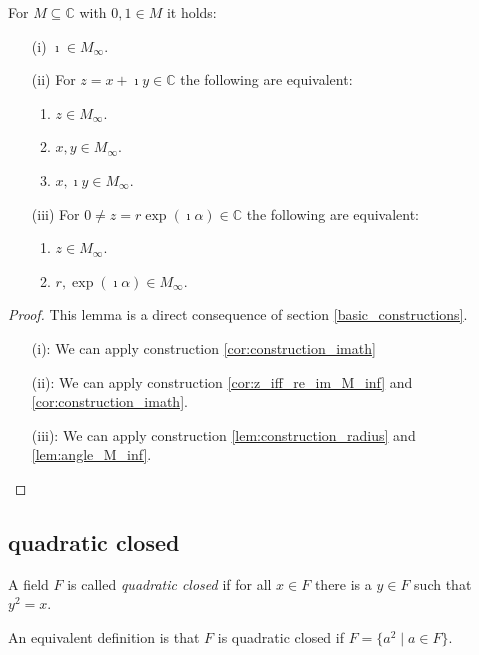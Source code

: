 \begin{lemma}
    \label{lem:M_inf_properties}
    \leanok
    For $M\subseteq \mathbb{C}$ with $0,1 \in M$ it holds:
    \begin{itemize}
        \item[(i)] $\imath \in M_{\infty}$.
        \item[(ii)] For $z = x + \imath y \in \mathbb{C}$ the following are equivalent:
            \begin{enumerate}
                \item $z \in M_{\infty}$.
                \item $x, y \in M_{\infty}$.
                \item $x, \imath y \in M_{\infty}$.
            \end{enumerate}
        \item[(iii)] 
            For $0 \ne z = r \exp(\imath \alpha) \in \mathbb{C}$ the following are equivalent:
            \begin{enumerate}
                \item $z \in M_{\infty}$.
                \item $r,\exp(\imath \alpha) \in M_{\infty}$.
            \end{enumerate}
    \end{itemize}
\end{lemma}
\begin{proof}
    This lemma is a direct consequence of section \ref{basic_constructions}.
    \begin{itemize}
        \item[(i):] We can apply construction \ref{cor:construction_imath}
        \item[(ii):] We can apply construction \ref{cor:z_iff_re_im_M_inf} and \ref{cor:construction_imath}.
        \item[(iii):]  We can apply construction \ref{lem:construction_radius} and \ref{lem:angle_M_inf}.
    \end{itemize}
\end{proof}

\subsection*{quadratic closed}
\begin{definition}
    \label{def:quadritc_closed_field}
    \leanok
    A field $F$ is called \emph{quadratic closed} if for all $x \in F$ there is a $y \in F$ such that $y^2 = x$.
\end{definition}
\begin{remark}
    An equivalent definition is that $F$ is quadratic closed if $F=\{a^2\mid a \in F\}$.
\end{remark}

